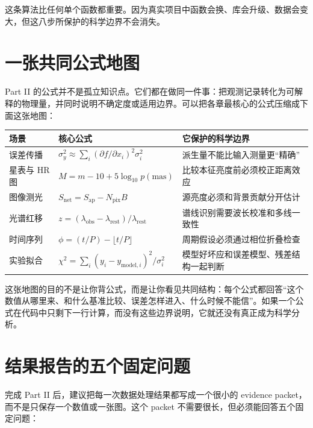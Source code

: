 这条算法比任何单个函数都重要。因为真实项目中函数会换、库会升级、数据会变大，但这八步所保护的科学边界不会消失。

\section*{一张共同公式地图}

Part II 的公式并不是孤立知识点。它们都在做同一件事：把观测记录转化为可解释的物理量，并同时说明不确定度或适用边界。可以把各章最核心的公式压缩成下面这张地图：

\begin{center}
\begin{tabular}{p{} p{} p{}}
\toprule
场景 & 核心公式 & 它保护的科学边界 \\
\midrule
误差传播 & \(\sigma_y^2 \approx \sum_i (\partial f/\partial x_i)^2\sigma_i^2\) & 派生量不能比输入测量更“精确” \\
星表与 HR 图 & \(M=m-10+5\log_{10}p(\mathrm{mas})\) & 比较本征亮度前必须校正距离效应 \\
图像测光 & \(S_{\mathrm{net}}=S_{\mathrm{ap}}-N_{\mathrm{pix}}B\) & 源亮度必须和背景贡献分开估计 \\
光谱红移 & \(z=(\lambda_{\mathrm{obs}}-\lambda_{\mathrm{rest}})/\lambda_{\mathrm{rest}}\) & 谱线识别需要波长校准和多线一致性 \\
时间序列 & \(\phi=(t/P)-\lfloor t/P\rfloor\) & 周期假设必须通过相位折叠检查 \\
实验拟合 & \(\chi^2=\sum_i (y_i-y_{\mathrm{model},i})^2/\sigma_i^2\) & 模型好坏应和误差模型、残差结构一起判断 \\
\bottomrule
\end{tabular}
\end{center}

这张地图的目的不是让你背公式，而是让你看见共同结构：每个公式都回答“这个数值从哪里来、和什么基准比较、误差怎样进入、什么时候不能信”。如果一个公式在代码中只剩下一行计算，而没有这些边界说明，它就还没有真正成为科学分析。

\section*{结果报告的五个固定问题}

完成 Part II 后，建议把每一次数据处理结果都写成一个很小的 evidence packet，而不是只保存一个数值或一张图。这个 packet 不需要很长，但必须能回答五个固定问题：

